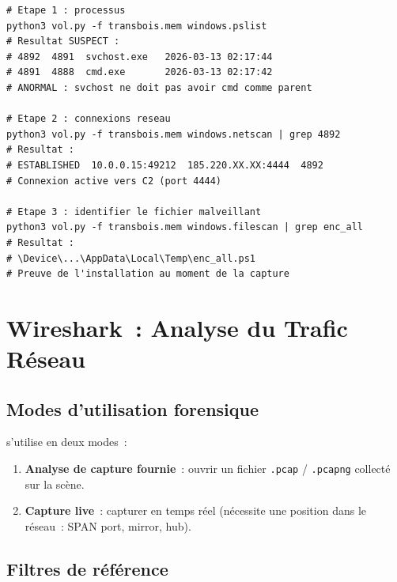 \begin{lstlisting}[language=bash_forensique,
    caption={Analyse Volatility --- Opération MVOM TRANSBOIS SA}]
# Etape 1 : processus
python3 vol.py -f transbois.mem windows.pslist
# Resultat SUSPECT :
# 4892  4891  svchost.exe   2026-03-13 02:17:44
# 4891  4888  cmd.exe       2026-03-13 02:17:42
# ANORMAL : svchost ne doit pas avoir cmd comme parent

# Etape 2 : connexions reseau
python3 vol.py -f transbois.mem windows.netscan | grep 4892
# Resultat :
# ESTABLISHED  10.0.0.15:49212  185.220.XX.XX:4444  4892
# Connexion active vers C2 (port 4444)

# Etape 3 : identifier le fichier malveillant
python3 vol.py -f transbois.mem windows.filescan | grep enc_all
# Resultat :
# \Device\...\AppData\Local\Temp\enc_all.ps1
# Preuve de l'installation au moment de la capture
\end{lstlisting}

\section{Wireshark~: Analyse du Trafic Réseau}
\label{sec:wireshark}

\subsection{Modes d'utilisation forensique}

 s'utilise en deux modes~:
\begin{enumerate}
    \item \textbf{Analyse de capture fournie}~: ouvrir un fichier
          \texttt{.pcap} / \texttt{.pcapng} collecté sur la scène.
    \item \textbf{Capture live}~: capturer en temps réel (nécessite
          une position dans le réseau~: SPAN port, mirror, hub).
\end{enumerate}

\subsection{Filtres de référence}

